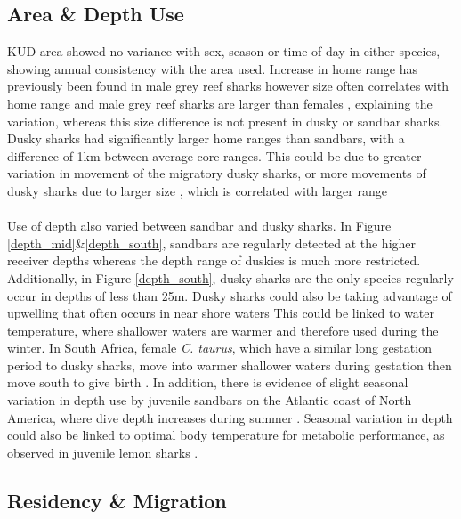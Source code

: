\documentclass[11pt,a4paper]{article}
\begin{document}
	\subsection{Area \& Depth Use}
	
	KUD area showed no variance with sex, season or time of day in either species, showing annual consistency with the area used. Increase in home range has previously been found in male grey reef sharks however size often correlates with home range and male grey reef sharks are larger than females \citep{Speed2010}, explaining the variation, whereas this size difference is not present in dusky or sandbar sharks. Dusky sharks had significantly larger home ranges than sandbars, with a difference of 1km between average core ranges. This could be due to greater variation in movement of the migratory dusky sharks, or more movements of dusky sharks due to larger size \citep{Braccini2017b}, which is correlated with larger range \citep{Speed2010}\\
	\\
	Use of depth also varied between sandbar and dusky sharks. In Figure \ref{depth_mid}\&\ref{depth_south}, sandbars  are regularly detected at the higher receiver depths whereas the depth range of duskies is much more restricted. Additionally, in Figure \ref{depth_south}, dusky sharks are the only species regularly occur in depths of less than 25m. Dusky sharks could also be taking advantage of upwelling that often occurs in near shore waters \citep{Wintner2018} This could be linked to water temperature, where shallower waters are warmer and therefore used during the winter. In South Africa, female \textit{C. taurus}, which have a similar long gestation period to dusky sharks, move into warmer shallower waters during gestation then move south to give birth \citep{Dicken2007}. In addition, there is evidence of slight seasonal variation in depth use by juvenile sandbars on the Atlantic coast of North America, where dive depth increases during summer \citep{Speed2010}. Seasonal variation in depth could also be linked to optimal body temperature for metabolic performance, as observed in juvenile lemon sharks \citep{Speed2010}.	
	

	\subsection{Residency \& Migration}
	
\end{document}
